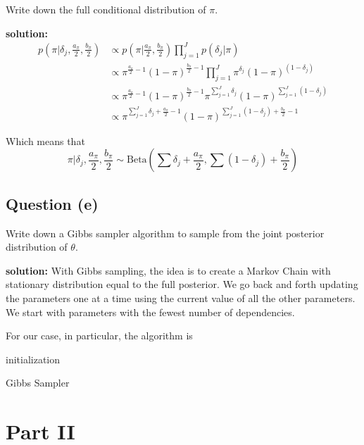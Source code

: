 \documentclass[
]{article}
\begin{document}
Write down the full conditional distribution of \(\pi\).

\textbf{solution:} \begin{align*}
  p\left(\pi | \delta_j, \frac{a_{\pi}}{2}, \frac{b_{\pi}}{2}\right) &\propto p\left(\pi | \frac{a_{\pi}}{2}, \frac{b_{\pi}}{2}\right) \prod_{j=1}^J p(\delta_j | \pi) \\
& \propto \pi^{\frac{a_{\pi}}{2} - 1}(1-\pi)^{\frac{b_{\pi}}{2} - 1} \prod_{j=1}^J\pi^{\delta_j} (1-\pi)^{(1-\delta_j)} \\
&\propto \pi^{\frac{a_{\pi}}{2} - 1}(1-\pi)^{\frac{b_{\pi}}{2} - 1} \pi^{\sum_{j=1}^J\delta_j } (1 - \pi)^{\sum_{j=1}^J(1-\delta_j) } \\
& \propto \pi^{\sum_{j=1}^J\delta_j + \frac{a_{\pi}}{2} - 1 }(1 - \pi)^{\sum_{j=1}^J(1-\delta_j) + \frac{b_{\pi}}{2} - 1}
\end{align*}

Which means that
\[\pi | \delta_j, \frac{a_{\pi}}{2}, \frac{b_{\pi}}{2} \sim \text{Beta}\left(\sum \delta_j + \frac{a_\pi}{2}, \sum (1-\delta_j)+ \frac{b_\pi}{2} \right)\]

\hypertarget{question-e}{%
\subsection{Question (e)}\label{question-e}}

Write down a Gibbs sampler algorithm to sample from the joint posterior
distribution of \(\theta\).

\textbf{solution:} With Gibbs sampling, the idea is to create a Markov
Chain with stationary distribution equal to the full posterior. We go
back and forth updating the parameters one at a time using the current
value of all the other parameters. We start with parameters with the
fewest number of dependencies.

For our case, in particular, the algorithm is

\begin{algorithm}[H]
\SetAlgoLined
{}
initialization\;
\caption{Gibbs Sampler}
\end{algorithm}

\hypertarget{part-ii}{%
\section{Part II}\label{part-ii}}
\end{document}
